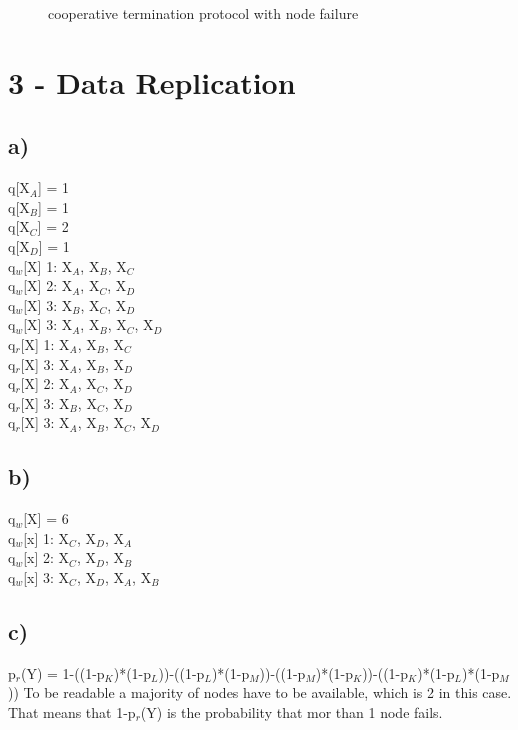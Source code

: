 \documentclass{scrartcl}
\begin{document}
\begin{figure}[!ht]
	\caption{cooperative termination protocol with node failure}
	\label{fig:2c}
\end{figure}

\newpage
\section*{3 - Data Replication}
\subsection*{a)}
q[X$_A$] = 1\\
q[X$_B$] = 1\\
q[X$_C$] = 2\\
q[X$_D$] = 1\\

q$_w$[X] 1: X$_A$, X$_B$, X$_C$\\
q$_w$[X] 2: X$_A$, X$_C$, X$_D$\\
q$_w$[X] 3: X$_B$, X$_C$, X$_D$\\
q$_w$[X] 3: X$_A$, X$_B$, X$_C$, X$_D$\\


q$_r$[X] 1: X$_A$, X$_B$, X$_C$\\
q$_r$[X] 3: X$_A$, X$_B$, X$_D$\\
q$_r$[X] 2: X$_A$, X$_C$, X$_D$\\
q$_r$[X] 3: X$_B$, X$_C$, X$_D$\\
q$_r$[X] 3: X$_A$, X$_B$, X$_C$, X$_D$\\

\subsection*{b)}
q$_w$[X] = 6\\
q$_w$[x] 1: X$_C$, X$_D$, X$_A$\\
q$_w$[x] 2: X$_C$, X$_D$, X$_B$\\
q$_w$[x] 3: X$_C$, X$_D$, X$_A$, X$_B$\\


\subsection*{c)}
p$_r$(Y) = 1-((1-p$_K$)*(1-p$_L$))-((1-p$_L$)*(1-p$_M$))-((1-p$_M$)*(1-p$_K$))-((1-p$_K$)*(1-p$_L$)*(1-p$_M$))
To be readable a majority of nodes have to be available, which is 2 in this case. That means that 1-p$_r$(Y) is the probability that mor than 1 node fails.
\end{document}
